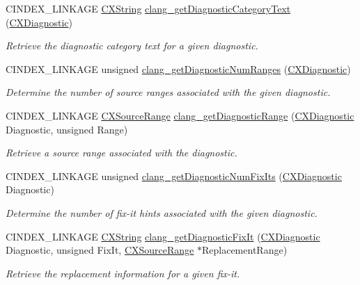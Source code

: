 \begin{DoxyCompactItemize}
C\+I\+N\+D\+E\+X\+\_\+\+L\+I\+N\+K\+A\+GE \hyperlink{structCXString}{C\+X\+String} \hyperlink{group__CINDEX__DIAG_ga6950702b6122f1cd74e1a369605a9f54}{clang\+\_\+get\+Diagnostic\+Category\+Text} (\hyperlink{group__CINDEX__DIAG_ga44bb8aba7c40590ad25d1763c4fbff7f}{C\+X\+Diagnostic})
\begin{DoxyCompactList}\small\item\em Retrieve the diagnostic category text for a given diagnostic. \end{DoxyCompactList}\item 
\mbox{\label{group__CINDEX__DIAG_ga7acbd761f1113ea657022e5708694924}} 
C\+I\+N\+D\+E\+X\+\_\+\+L\+I\+N\+K\+A\+GE unsigned \hyperlink{group__CINDEX__DIAG_ga7acbd761f1113ea657022e5708694924}{clang\+\_\+get\+Diagnostic\+Num\+Ranges} (\hyperlink{group__CINDEX__DIAG_ga44bb8aba7c40590ad25d1763c4fbff7f}{C\+X\+Diagnostic})
\begin{DoxyCompactList}\small\item\em Determine the number of source ranges associated with the given diagnostic. \end{DoxyCompactList}\item 
C\+I\+N\+D\+E\+X\+\_\+\+L\+I\+N\+K\+A\+GE \hyperlink{structCXSourceRange}{C\+X\+Source\+Range} \hyperlink{group__CINDEX__DIAG_gabd440f1577374289ffebe73d9f65b294}{clang\+\_\+get\+Diagnostic\+Range} (\hyperlink{group__CINDEX__DIAG_ga44bb8aba7c40590ad25d1763c4fbff7f}{C\+X\+Diagnostic} Diagnostic, unsigned Range)
\begin{DoxyCompactList}\small\item\em Retrieve a source range associated with the diagnostic. \end{DoxyCompactList}\item 
\mbox{\label{group__CINDEX__DIAG_gafe38dfd661f6ba59df956dfeabece2a2}} 
C\+I\+N\+D\+E\+X\+\_\+\+L\+I\+N\+K\+A\+GE unsigned \hyperlink{group__CINDEX__DIAG_gafe38dfd661f6ba59df956dfeabece2a2}{clang\+\_\+get\+Diagnostic\+Num\+Fix\+Its} (\hyperlink{group__CINDEX__DIAG_ga44bb8aba7c40590ad25d1763c4fbff7f}{C\+X\+Diagnostic} Diagnostic)
\begin{DoxyCompactList}\small\item\em Determine the number of fix-\/it hints associated with the given diagnostic. \end{DoxyCompactList}\item 
C\+I\+N\+D\+E\+X\+\_\+\+L\+I\+N\+K\+A\+GE \hyperlink{structCXString}{C\+X\+String} \hyperlink{group__CINDEX__DIAG_gadf990bd68112475c5c07b19c1fe3938a}{clang\+\_\+get\+Diagnostic\+Fix\+It} (\hyperlink{group__CINDEX__DIAG_ga44bb8aba7c40590ad25d1763c4fbff7f}{C\+X\+Diagnostic} Diagnostic, unsigned Fix\+It, \hyperlink{structCXSourceRange}{C\+X\+Source\+Range} $\ast$Replacement\+Range)
\begin{DoxyCompactList}\small\item\em Retrieve the replacement information for a given fix-\/it. \end{DoxyCompactList}\end{DoxyCompactItemize}


